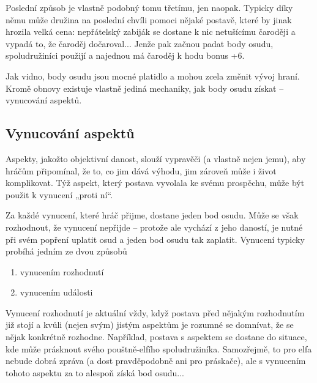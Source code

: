 \documentclass[../main.tex]{subfiles}
\begin{document}
Poslední způsob je vlastně podobný tomu třetímu, jen naopak. Typicky díky němu může družina na poslední chvíli pomoci nějaké postavě, které by jinak hrozila velká cena: nepřátelský zabiják se dostane k nic netušícímu čaroději a vypadá to, že čaroděj dočaroval... Jenže pak začnou padat body osudu, spoludružiníci použijí   a najednou má čaroděj k hodu bonus +6.

Jak vidno, body osudu jsou mocné platidlo a mohou zcela změnit vývoj hraní. Kromě obnovy existuje vlastně jediná mechaniky, jak body osudu získat – vynucování aspektů.

\subsection{Vynucování aspektů}
\label{sec:vynucovani-aspektu}

Aspekty, jakožto objektivní danost, slouží vypravěči (a vlastně nejen jemu), aby hráčům připomínal, že to, co jim dává výhodu, jim zároveň může i život komplikovat. Týž aspekt, který postava vyvolala ke svému prospěchu, může být použit k vynucení „proti ní“.

Za každé vynucení, které hráč přijme, dostane jeden bod osudu. Může se však rozhodnout, že vynucení nepřijde – protože ale vychází z jeho daností, je nutné při svém popření uplatit osud a jeden bod osudu tak zaplatit. Vynucení typicky probíhá jedním ze dvou způsobů

\begin{enumerate}
\item vynucením rozhodnutí
\item vynucením události
\end{enumerate}

Vynucení rozhodnutí je aktuální vždy, když postava před nějakým rozhodnutím již stojí a kvůli (nejen svým) jistým aspektům je rozumné se domnívat, že se nějak konkrétně rozhodne. Například, postava s aspektem  se dostane do situace, kde může prásknout svého pouštně-elfího spoludružiníka. Samozřejmě, to pro elfa nebude dobrá zpráva (a dost pravděpodobně ani pro práskače), ale s vynucením tohoto aspektu za to alespoň získá bod osudu...
\end{document}
